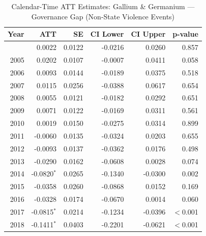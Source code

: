 \begin{longtable}{rrrrrr}
\caption{Calendar-Time ATT Estimates: Gallium \& Germanium --- Governance Gap (Non-State Violence Events)} \label{tab:cal_gallium_germanium} \\
\toprule
\textbf{Year} & \textbf{ATT} & \textbf{SE} & \textbf{CI Lower} & \textbf{CI Upper} & \textbf{p-value} \\
\midrule
\endfirsthead
\bottomrule
\endlastfoot
2004 & 0.0022 & 0.0122 & -0.0216 & 0.0260 & 0.857 \\
2005 & 0.0202 & 0.0107 & -0.0007 & 0.0411 & 0.058 \\
2006 & 0.0093 & 0.0144 & -0.0189 & 0.0375 & 0.518 \\
2007 & 0.0115 & 0.0256 & -0.0388 & 0.0617 & 0.654 \\
2008 & 0.0055 & 0.0121 & -0.0182 & 0.0292 & 0.651 \\
2009 & 0.0071 & 0.0122 & -0.0169 & 0.0311 & 0.561 \\
2010 & 0.0019 & 0.0150 & -0.0275 & 0.0314 & 0.899 \\
2011 & -0.0060 & 0.0135 & -0.0324 & 0.0203 & 0.655 \\
2012 & -0.0093 & 0.0137 & -0.0362 & 0.0176 & 0.498 \\
2013 & -0.0290 & 0.0162 & -0.0608 & 0.0028 & 0.074 \\
2014 & -0.0820$^{*}$ & 0.0265 & -0.1340 & -0.0300 & 0.002 \\
2015 & -0.0358 & 0.0260 & -0.0868 & 0.0152 & 0.169 \\
2016 & -0.0328 & 0.0174 & -0.0670 & 0.0014 & 0.060 \\
2017 & -0.0815$^{*}$ & 0.0214 & -0.1234 & -0.0396 & $<$0.001 \\
2018 & -0.1411$^{*}$ & 0.0403 & -0.2201 & -0.0621 & $<$0.001 \\
\end{longtable}
